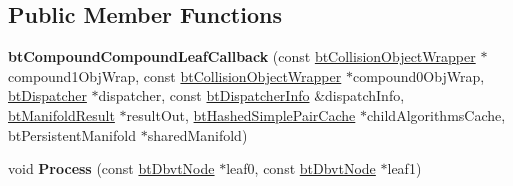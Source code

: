 \subsection*{Public Member Functions}
\begin{DoxyCompactItemize}
\item 
\mbox{\label{structbtCompoundCompoundLeafCallback_a7b7baaf45271219f64c915884152d7e0}} 
{\bfseries bt\+Compound\+Compound\+Leaf\+Callback} (const \hyperlink{structbtCollisionObjectWrapper}{bt\+Collision\+Object\+Wrapper} $\ast$compound1\+Obj\+Wrap, const \hyperlink{structbtCollisionObjectWrapper}{bt\+Collision\+Object\+Wrapper} $\ast$compound0\+Obj\+Wrap, \hyperlink{classbtDispatcher}{bt\+Dispatcher} $\ast$dispatcher, const \hyperlink{structbtDispatcherInfo}{bt\+Dispatcher\+Info} \&dispatch\+Info, \hyperlink{classbtManifoldResult}{bt\+Manifold\+Result} $\ast$result\+Out, \hyperlink{classbtHashedSimplePairCache}{bt\+Hashed\+Simple\+Pair\+Cache} $\ast$child\+Algorithms\+Cache, bt\+Persistent\+Manifold $\ast$shared\+Manifold)
\item 
\mbox{\label{structbtCompoundCompoundLeafCallback_a1668e5131b842bebe80e75fb51a251b9}} 
void {\bfseries Process} (const \hyperlink{structbtDbvtNode}{bt\+Dbvt\+Node} $\ast$leaf0, const \hyperlink{structbtDbvtNode}{bt\+Dbvt\+Node} $\ast$leaf1)
\end{DoxyCompactItemize}
